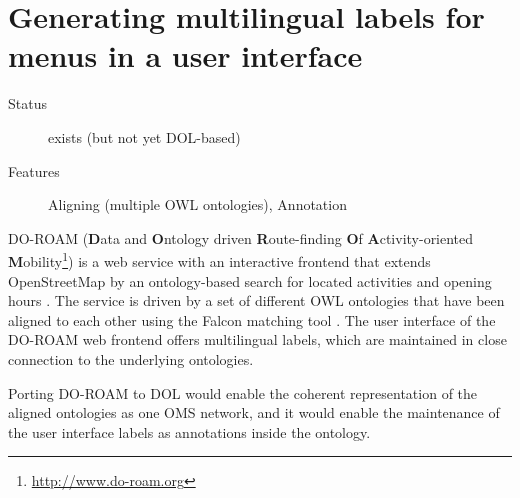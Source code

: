 \documentclass[10pt,%
\ifpretendfinal
final%
\else
draft%
\fi,
]{scrreprt}
\newcommand{\sclause}[1]{\section{#1}}
\begin{document}
\newenvironment{usecase}[3]{\sclause{#1}%
\begin{description}
\item[Status] #2
\item[Features] #3
\end{description}
}{}
\begin{usecase}{Generating multilingual labels for menus in a user interface}{exists (but not yet DOL-based)}{Aligning (multiple OWL ontologies), Annotation}
  DO-ROAM (\textbf{D}ata and \textbf{O}ntology driven \textbf{R}oute-finding \textbf{O}f \textbf{A}ctivity-oriented \textbf{M}obility\footnote{\url{http://www.do-roam.org}}) is a web service with an interactive frontend that extends OpenStreetMap by an ontology-based search for located activities and opening hours \cite{do-roam}.  The service is driven by a set of different OWL ontologies that have been aligned to each other using the Falcon matching tool \cite{HuQu-08}.  The user interface of the DO-ROAM web frontend offers multilingual labels, which are maintained in close connection to the underlying ontologies.

  Porting DO-ROAM to DOL would enable the coherent representation of the aligned ontologies as one OMS network, and it would enable  the maintenance of the user interface labels as annotations inside the ontology.
\end{usecase}
\end{document}
